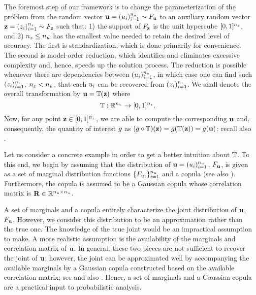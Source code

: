 The foremost step of our framework is to change the parameterization of the
problem from the random vector $\mathbf{u} = (u_i)_{i = 1}^{n_u} \sim F_{\mathbf{u}}$
to an auxiliary random vector $\mathbf{z} = (z_i)_{i = 1}^{n_z} \sim F_{\mathbf{z}}$
such that: 1) the support of $F_{\mathbf{z}}$ is the unit hypercube $[0,
1]^{n_z}$, and 2) ${n_z} \leq {n_u}$ has the smallest value needed to retain the
desired level of accuracy. The first is standardization, which is done primarily
for convenience. The second is model-order reduction, which identifies and
eliminates excessive complexity and, hence, speeds up the solution process. The
reduction is possible whenever there are dependencies between $(u_i)_{i =
1}^{n_u}$, in which case one can find such $(z_i)_{i = 1}^{n_z}$, ${n_z} < {n_u}$, that
each $u_i$ can be recovered from $(z_i)_{i = 1}^{n_z}$. We shall denote the
overall transformation by $\mathbf{u} = \mathbb{T}(\mathbf{z})$ where
\begin{equation} \elab{transformation}
  \transformation: \real^\nu \to [0, 1]^\nz.
\end{equation}
Now, for any point $\mathbf{z} \in [0, 1]^{n_z}$, we are able to compute the
corresponding $\mathbf{u}$ and, consequently, the quantity of interest $g$ as $(g
\circ \mathbb{T})(\mathbf{z}) = g(\mathbb{T}(\mathbf{z})) = g(\mathbf{u})$; recall also
.

Let us consider a concrete example in order to get a better intuition about
$\mathbb{T}$. To this end, we begin by assuming that the distribution of
$\mathbf{u} = (u_i)_{i = 1}^{n_u}$, $F_{\mathbf{u}}$, is given as a set of marginal
distribution functions $\{ F_{u_i} \}_{i = 1}^{n_u}$ and a copula
\cite{nelsen2006} (see also ). Furthermore, the copula is
assumed to be a Gaussian copula whose correlation matrix is $\mathbf{R} \in
\mathbb{R}^{{n_u} \times {n_u}}$.

\begin{remark}
A set of marginals and a copula entirely characterize the joint distribution of
$\mathbf{u}$, $F_{\mathbf{u}}$. However, we consider this distribution to be an
approximation rather than the true one. The knowledge of the true joint would be
an impractical assumption to make. A more realistic assumption is the
availability of the marginals and correlation matrix of $\mathbf{u}$. In general, these
two pieces are not sufficient to recover the joint of $\mathbf{u}$; however, the joint
can be approximated well by accompanying the available marginals by a Gaussian
copula constructed based on the available correlation matrix; see \cite{liu1986}
and also \cite{ukhov2014}. Hence, a set of marginals and a Gaussian copula are
a practical input to probabilistic analysis.
\end{remark}

